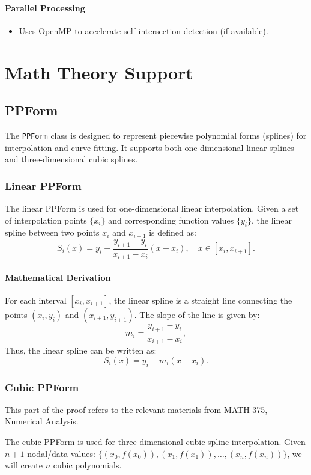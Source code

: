 \documentclass[a4paper]{article}
\begin{document}
\begin{sloppypar}
\paragraph*{Parallel Processing}
\begin{itemize}
  \item Uses OpenMP to accelerate self-intersection detection (if available).
\end{itemize}

\section{Math Theory Support}
\subsection{PPForm}
The \verb|PPForm| class is designed to represent piecewise polynomial forms (splines) for interpolation and curve fitting. It supports both one-dimensional linear splines and three-dimensional cubic splines.

\subsubsection{Linear PPForm}
The linear PPForm is used for one-dimensional linear interpolation. Given a set of interpolation points \(\{x_i\}\) and corresponding function values \(\{y_i\}\), the linear spline between two points \(x_i\) and \(x_{i+1}\) is defined as:
\[ S_i(x) = y_i + \frac{y_{i+1} - y_i}{x_{i+1} - x_i} (x - x_i), \quad x \in [x_i, x_{i+1}]. \]

\paragraph*{Mathematical Derivation}
For each interval \([x_i, x_{i+1}]\), the linear spline is a straight line connecting the points \((x_i, y_i)\) and \((x_{i+1}, y_{i+1})\). The slope of the line is given by:
\[ m_i = \frac{y_{i+1} - y_i}{x_{i+1} - x_i}, \]
Thus, the linear spline can be written as:
\[ S_i(x) = y_i + m_i (x - x_i). \]

\subsubsection{Cubic PPForm}
This part of the proof refers to the relevant materials from MATH 375, Numerical Analysis.

The cubic PPForm is used for three-dimensional cubic spline interpolation. Given \(n+1\) nodal/data values: \(\{(x_0,f(x_0)),(x_1,f(x_1)),\ldots,(x_n,f(x_n))\}\), we will create \(n\) cubic polynomials.


\end{sloppypar}
\end{document}
